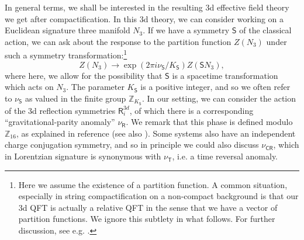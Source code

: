 \documentclass[12pt]{article}%
\numberwithin{equation}{section}
\renewcommand{\(}{\left(}
\renewcommand{\)}{\right)}
\renewcommand{\[}{\left[}
\renewcommand{\]}{\right]}
\begin{document}
In general terms, we shall be interested in the resulting 3d effective field theory we get after compactification.
In this 3d theory, we can consider working on a Euclidean signature three manifold $N_3$. If we have a symmetry $\mathsf{S}$
of the classical action, we can ask about the response to the partition function $Z(N_3)$ under such a symmetry
transformation:\footnote{Here we assume the existence of a partition function. A common situation, especially in string compactification
on a non-compact background is that our 3d QFT is actually a relative QFT in the sense that we have a vector of partition functions. We ignore this subtlety in what follows. For further discussion, see e.g. \cite{Tachikawa:2013hya, DelZotto:2015isa, Witten_1997, Aharony_1998, Witten_1998, Moore_2005, Belov:2006jd, Freed_2007, witten2008conformal, Witten:2009at, Henningson:2010rc, freed2014relative, Monnier:2014txa, Monnier:2016jlo, Monnier:2017klz}.}
\begin{equation}
Z(N_3) \rightarrow \exp( 2\pi i \nu_{\mathsf{S}} / K_{\mathsf{S}}) Z(\mathsf{S} N_3),
\end{equation}
where here, we allow for the possibility that $\mathsf{S}$ is a spacetime transformation which acts on $N_3$.
The parameter $K_{\mathsf{S}}$ is a positive integer, and so we often refer to $\nu_{\mathsf{S}}$ as valued in the
finite group $\mathbb{Z}_{K_{\mathsf{S}}}$.
In our setting, we can consider the action of the 3d reflection symmetries $\mathsf{R}_{i}^{3d}$, of which there is a corresponding
``gravitational-parity anomaly'' $\nu_{\mathsf{R}}$. We remark that this phase is defined modulo $\mathbb{Z}_{16}$, as explained in reference \cite{Witten:2016cio} (see also \cite{Hsieh:2015xaa}). Some systems also have an independent charge conjugation symmetry, and so in principle we could also discuss $\nu_{\mathsf{CR}}$, which in Lorentzian signature is synonymous with $\nu_{\mathsf{T}}$, i.e. a time reversal anomaly.
\end{document}
